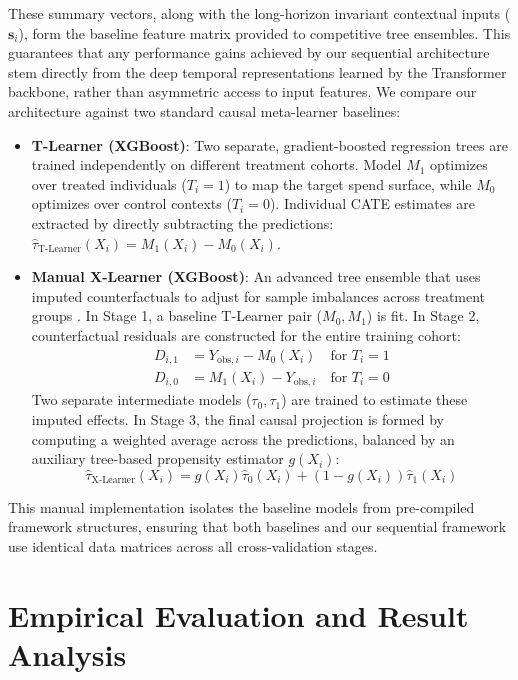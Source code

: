 \documentclass[10pt, conference]{IEEEtran}
\begin{document}
These summary vectors, along with the long-horizon invariant contextual inputs ($\mathbf{s}_i$), form the baseline feature matrix provided to competitive tree ensembles. This guarantees that any performance gains achieved by our sequential architecture stem directly from the deep temporal representations learned by the Transformer backbone, rather than asymmetric access to input features. We compare our architecture against two standard causal meta-learner baselines:
\begin{itemize}
    \item \textbf{T-Learner (XGBoost)}: Two separate, gradient-boosted regression trees are trained independently on different treatment cohorts. Model $M_1$ optimizes over treated individuals ($T_i=1$) to map the target spend surface, while $M_0$ optimizes over control contexts ($T_i=0$). Individual CATE estimates are extracted by directly subtracting the predictions: $\hat{\tau}_{\text{T-Learner}}(X_i) = M_1(X_i) - M_0(X_i)$.
    \item \textbf{Manual X-Learner (XGBoost)}: An advanced tree ensemble that uses imputed counterfactuals to adjust for sample imbalances across treatment groups \cite{Kunzel2019}. In Stage 1, a baseline T-Learner pair ($M_0, M_1$) is fit. In Stage 2, counterfactual residuals are constructed for the entire training cohort:
    \begin{equation}
    \begin{aligned}
    D_{i,1} &= Y_{\text{obs},i} - M_0(X_i) \quad \text{for } T_i=1 \\
    D_{i,0} &= M_1(X_i) - Y_{\text{obs},i} \quad \text{for } T_i=0
    \end{aligned}
    \end{equation}
    Two separate intermediate models ($\tau_0, \tau_1$) are trained to estimate these imputed effects. In Stage 3, the final causal projection is formed by computing a weighted average across the predictions, balanced by an auxiliary tree-based propensity estimator $g(X_i)$:
    \begin{equation}
    \hat{\tau}_{\text{X-Learner}}(X_i) = g(X_i)\hat{\tau}_0(X_i) + \left(1 - g(X_i)\right)\hat{\tau}_1(X_i)
    \end{equation}
\end{itemize}
This manual implementation isolates the baseline models from pre-compiled framework structures, ensuring that both baselines and our sequential framework use identical data matrices across all cross-validation stages.

\section{Empirical Evaluation and Result Analysis}
\label{sec:empirical_evaluation}
\end{document}
